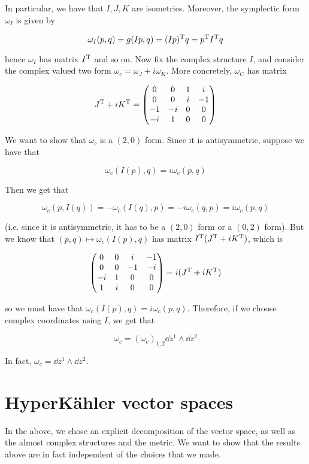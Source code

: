 \documentclass{article}
\begin{document}
In particular, we have that \(I, J, K\) are isometries. Moreover, the symplectic form \(\omega_I\) is given by

\[\omega_I(p, q) = g(Ip, q) = (Ip)^{\mathrm{T}} q = p^{\mathrm{T}} I^{\mathrm{T}} q\]

hence \(\omega_I\) has matrix \(I^{\mathrm{T}}\) and so on. Now fix the complex structure \(I\), and consider the complex valued two form \(\omega_c = \omega_J + i\omega_K\). More concretely, \(\omega_C\) has matrix

\[J^{\mathrm{T}} + iK^{\mathrm{T}} = \begin{pmatrix}
    0 & 0 & 1 & i \\
    0 & 0 & i & -1 \\
    -1 & -i & 0 & 0 \\
    -i & 1 & 0 & 0
\end{pmatrix}\]

We want to show that \(\omega_c\) is a \((2, 0)\) form. Since it is antisymmetric, suppose we have that

\[\omega_c(I(p), q) = i\omega_c(p, q)\]

Then we get that

\[\omega_c(p, I(q)) = -\omega_c(I(q), p) = -i\omega_c(q, p) = i\omega_c(p, q)\]

(i.e. since it is antisymmetric, it has to be a \((2, 0)\) form or a \((0, 2)\) form). But we know that \((p, q) \mapsto \omega_c(I(p), q)\) has matrix \(I^{\mathrm{T}}(J^{\mathrm{T}} + iK^{\mathrm{T}})\), which is

\[\begin{pmatrix}
    0 & 0 & i & -1 \\
    0 & 0 & -1 & -i \\
    -i & 1 & 0 & 0 \\
    1 & i & 0 & 0
\end{pmatrix} = i(J^{\mathrm{T}} + iK^{\mathrm{T}})\]

so we must have that \(\omega_c(I(p), q) = i\omega_c(p, q)\). Therefore, if we choose complex coordinates using \(I\), we get that

\[\omega_c = (\omega_c)_{1,2}\dd z^1 \wedge \dd z^2\]

In fact, \(\omega_c = \dd z^1 \wedge \dd z^2\).

\section{HyperK\"ahler vector spaces}

In the above, we chose an explicit decomposition of the vector space, as well as the almost complex structures and the metric. We want to show that the results above are in fact independent of the choices that we made.
\end{document}
